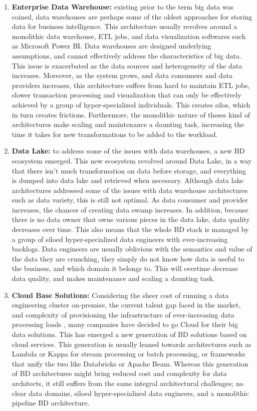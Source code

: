 \documentclass[runningheads]{llncs}
\begin{document}
\begin{enumerate}
    \item \textbf{Enterprise Data Warehouse:} existing prior to the term big data was coined, data warehouses are perhaps some of the oldest approaches for storing data for business intelligence. This architecture usually revolves around a monolithic data warehouse, ETL jobs, and data visualization softwares such as Microsoft Power BI. Data warehouses are designed underlying assumptions, and cannot effectively address the characteristics of big data. This issue is exacerbated as the data sources and heterogeneity of the data increases. Moreover, as the system grows, and data consumers and data providers increases, this architecture suffers from hard to maintain ETL jobs, slower transaction processing and visualization that can only be effectively achieved by a group of hyper-specialized individuals. This creates silos, which in turn creates frictions. Furthermore, the monolithic nature of theses kind of architectures make scaling and maintenance a daunting task, increasing the time it takes for new transformations to be added to the workload.
    \item \textbf{Data Lake:} to address some of the issues with data warehouses, a new BD ecosystem emerged. This new ecosystem revolved around Data Lake, in a way that there isn't much transformation on data before storage, and everything is dumped into data lake and retrieved when necessary. Although data lake architectures addressed some of the issues with data warehouse architectures such as data variety, this is still not optimal. As data consumer and provider increases, the chances of creating data swamp increases. In addition, because there is no data owner that owns various pieces in the data lake, data quality decreases over time. This also means that the whole BD stack is managed by a group of siloed hyper-specialized data engineers with ever-increasing backlogs. Data engineers are usually oblivious with the semantics and value of the data they are crunching, they simply do not know how data is useful to the business, and which domain it belongs to. This will overtime decrease data quality, and makes maintenance and scaling a daunting task. 
    \item \textbf{Cloud Base Solutions:} Considering the sheer cost of running a data engineering cluster on-premise, the current talent gap faced in the market, and complexity of provisioning the infrastructure of ever-increasing data processing loads \cite{AtaeiHype}, many companies have decided to go Cloud for their big data solutions. This has emerged a new generation of BD solutions based on cloud services. This generation is usually leaned towards architectures such as Lambda or Kappa for stream processing or batch processing, or frameworks that unify the two like Databricks or Apache Beam. Whereas this generation of BD architectures might bring reduced cost and complexity for data architects, it still suffers from the same integral architectural challenges; no clear data domains, siloed hyper-specialized data engineers, and a monolithic pipeline BD architecture.
\end{enumerate}
\end{document}
